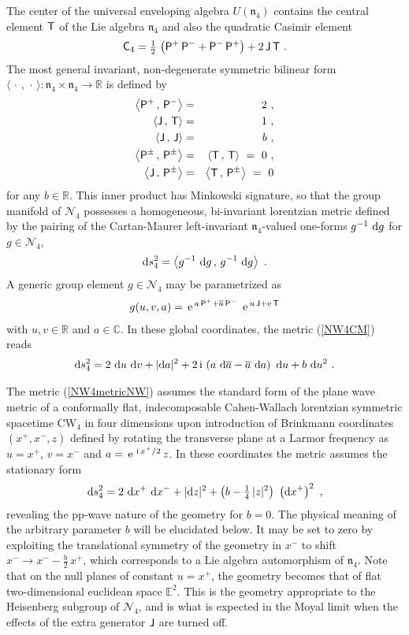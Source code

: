 \documentclass[11pt,a4paper]{article}
\newcommand{\ii}{{\rm i}}
\newcommand{\C}{\complex}
\def\ii{{\,{\rm i}\,}}
\def\dd{{\rm d}}
\def\P{{\sf P}}
\def\T{{\sf T}}
\def\C{{\sf C}}
\def\J{{\sf J}}
\newcommand{\complex}{{\mathbb C}} %
\newcommand{\real}{{\mathbb R}} %
\newcommand{\eucl}{{\mathbb E}}
\def\nn{\nonumber}
\def\e{{\,\rm e}\,}
\def\bea{\begin{eqnarray}}
\def\eea{\end{eqnarray}}
\newcommand{\beq}{\begin{eqnarray}}
\newcommand{\eeq}{\end{eqnarray}}
\begin{document}
The center of the universal enveloping algebra $U(\mathfrak n_4)$
contains the central element $\T$ of the Lie algebra $\mathfrak{n}_4$
and also the quadratic Casimir element
\beq
\C_4=\mbox{$\frac12$}\,\left(\P^+\,\P^-+\P^-\,\P^+\right)+2\,
\J\,\T \ .
\label{NW4Casimir}\eeq
The most general invariant, non-degenerate symmetric bilinear form
$\langle\,\cdot\,,\,\cdot\,\rangle:\mathfrak{n}_4\times\mathfrak{n}_4\to\real$
is defined by
\bea
\left\langle\P^+\,,\,\P^-\right\rangle&=&2 \ , \nn\\
\left\langle\J\,,\,\T\right\rangle&=&1 \ , \nn\\
\left\langle\J\,,\,\J\right\rangle&=&b \ , \nn\\
\left\langle\P^\pm\,,\,\P^\pm\right\rangle&=&
\left\langle\T\,,\,\T\right\rangle~=~0 \ , \nn\\
\left\langle\J\,,\,\P^\pm\right\rangle&=&\left\langle\T\,,\,
\P^\pm\right\rangle~=~0
\label{NW4innerprod}\eea
for any $b\in\real$. This inner product has Minkowski signature, so that the
group manifold of $\mathcal N_4$ possesses a
homogeneous, bi-invariant lorentzian metric defined by the pairing of
the Cartan-Maurer left-invariant $\mathfrak n_4$-valued one-forms
$g^{-1}~\dd g$ for $g\in\mathcal N_4$,
\beq
\dd s_4^2=\left\langle g^{-1}~\dd g\,,\,g^{-1}~\dd g\right\rangle \ .
\label{NW4CM}\eeq
A generic group element $g\in\mathcal N_4$ may be parametrized as
\beq
g(u,v,a)=\e^{a\,\P^++\overline{a}\,\P^-}~
\e^{u\,\J+v\,\T}
\label{NW4coords}\eeq
with $u,v\in\real$ and $a\in\complex$. In these
global coordinates, the metric (\ref{NW4CM}) reads
\beq
\dd s_4^2=2~\dd u~\dd v+|\dd a|^2+2\ii\left(a~
\dd\overline{a}-\overline{a}~\dd a\right)~\dd u+b~\dd u^2 \ .
\label{NW4metricNW}\eeq

The metric (\ref{NW4metricNW}) assumes the standard form of the plane
wave metric of a conformally flat, indecomposable Cahen-Wallach
lorentzian symmetric spacetime CW$_4$ in four dimensions upon
introduction of Brinkmann coordinates $(x^+,x^-,z)$ defined by
rotating the transverse plane at a Larmor frequency as $u=x^+$,
$v=x^-$ and $a=\e^{\ii x^+/2}\,z$. In these coordinates the metric
assumes the stationary form
\beq
\dd s_4^2=2~\dd x^+~\dd x^-+|\dd z|^2+\left(b-\mbox{$\frac14$}\,|z|^2\right)~
\left(\dd x^+\right)^2 \ ,
\label{NW4metricBrink}\eeq
revealing the pp-wave nature of the geometry for $b=0$. The physical
meaning of the arbitrary parameter $b$ will be elucidated below. It
may be set to zero by exploiting the translational symmetry of the
geometry in $x^-$ to shift $x^-\to x^--\frac b2\,x^+$, which
corresponds to a Lie algebra automorphism of $\mathfrak n_4$. Note
that on the null planes of constant $u=x^+$, the geometry becomes that of
flat two-dimensional euclidean space $\eucl^2$. This is the geometry
appropriate to the Heisenberg subgroup of $\mathcal{N}_4$, and is what
is expected in the Moyal limit when the effects of the extra generator
$\J$ are turned off.
\end{document}
